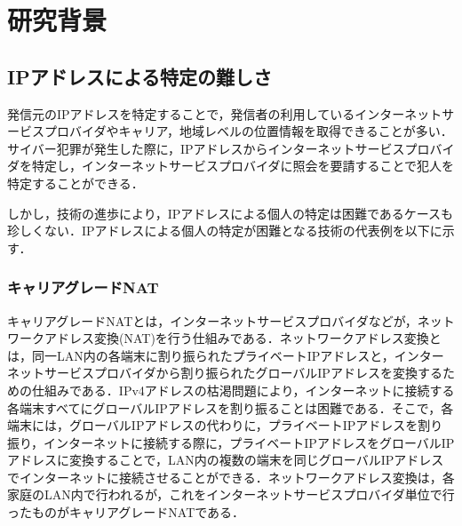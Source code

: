 \documentclass[10pt, a4paper]{jreport}
\begin{document}
\newpage
















\chapter{研究背景}
\section{IPアドレスによる特定の難しさ}
発信元のIPアドレスを特定することで，発信者の利用しているインターネットサービスプロバイダやキャリア，地域レベルの位置情報を取得できることが多い．サイバー犯罪が発生した際に，IPアドレスからインターネットサービスプロバイダを特定し，インターネットサービスプロバイダに照会を要請することで犯人を特定することができる．

しかし，技術の進歩により，IPアドレスによる個人の特定は困難であるケースも珍しくない．IPアドレスによる個人の特定が困難となる技術の代表例を以下に示す．

\subsection{キャリアグレードNAT}
キャリアグレードNATとは，インターネットサービスプロバイダなどが，ネットワークアドレス変換(NAT)を行う仕組みである．ネットワークアドレス変換とは，同一LAN内の各端末に割り振られたプライベートIPアドレスと，インターネットサービスプロバイダから割り振られたグローバルIPアドレスを変換するための仕組みである．IPv4アドレスの枯渇問題により，インターネットに接続する各端末すべてにグローバルIPアドレスを割り振ることは困難である．そこで，各端末には，グローバルIPアドレスの代わりに，プライベートIPアドレスを割り振り，インターネットに接続する際に，プライベートIPアドレスをグローバルIPアドレスに変換することで，LAN内の複数の端末を同じグローバルIPアドレスでインターネットに接続させることができる．ネットワークアドレス変換は，各家庭のLAN内で行われるが，これをインターネットサービスプロバイダ単位で行ったものがキャリアグレードNATである．
\end{document}
